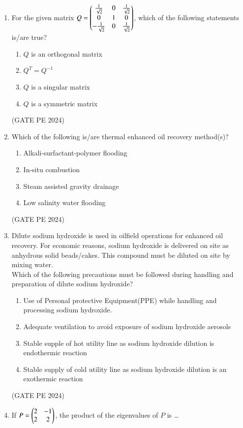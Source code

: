 \documentclass[journal,12pt,onecolumn]{IEEEtran}
\theoremstyle{remark}
\begin{document}
\begin{enumerate}
\item For the given matrix $Q=\begin{pmatrix}\frac{1}{\sqrt{2}}&0&\frac{1}{\sqrt{2}}\\
0&1&0\\
-\frac{1}{\sqrt{2}}&0&\frac{1}{\sqrt{2}}\end{pmatrix}$, which of the following statements is/are true?
\begin{enumerate}
    \item $Q$ is an orthogonal matrix
    \item $Q^T=Q^{-1}$
    \item $Q$ is a singular matrix
    \item $Q$ is a symmetric matrix
\end{enumerate}
\hfill{(GATE PE 2024)}

\item Which of the following is/are thermal enhanced oil recovery method(s)?
\begin{enumerate}
    \item Alkali-surfactant-polymer flooding
    \item In-situ combustion
    \item Steam assisted gravity drainage
    \item Low salinity water flooding
\end{enumerate}
\hfill{(GATE PE 2024)}

\item Dilute sodium hydroxide is used in oilfield operations for enhanced oil recovery. For economic reasons, sodium hydroxide is delivered on site as anhydrous solid beads/cakes. This compound must be diluted on site by mixing water.\\
Which of the following precautions must be followed during handling and preparation of dilute sodium hydroxide?
\begin{enumerate}
    \item Use of Personal protective Equipment(PPE) while handling and processing sodium hydroxide.
    \item Adequate ventilation to avoid exposure of sodium hydroxide aerosols
    \item Stable supple of hot utility line as sodium hydroxide dilution is endothermic reaction
    \item Stable supply of cold utility line as sodium hydroxide dilution is an exothermic reaction
\end{enumerate}
\hfill{(GATE PE 2024)}

\item If $P=\begin{pmatrix}2&-1\\
2&2\end{pmatrix}$, the product of the eigenvalues of $P$ is \dots


\end{enumerate}
\end{document}
